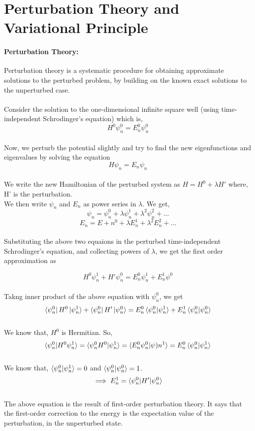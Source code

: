 \documentclass[12pt]{article}
\begin{document}
\section{Perturbation Theory and Variational Principle}

\paragraph{Perturbation Theory:}

Perturbation theory is a systematic procedure for obtaining approximate solutions to the perturbed problem, by building 
on the known exact solutions to the unperturbed case.
\\
\\
Consider the solution to the one-dimensional infinite square well (using time-independent Schrodinger's equation) which is, 
\[ H^0 \psi_n^0 = E_n^0 \psi_n^0\]
\\
Now, we perturb the potential slightly and try to find the new eigenfunctions and eigenvalues by solving the equation 
\[ H \psi_n = E_n \psi_n\]
\\
We write the new Hamiltonian of the perturbed system as $ H = H^0 + \lambda H'$ where, H' is the perturbation.
\\
We then write $\psi_n$ and $E_n$ as power series in $\lambda$. We get,
\[ \psi_n = \psi_n^0 + \lambda\psi_n^1 + \lambda^2 \psi_n^2 + ...\]
\[ E_n = E+n^0 + \lambda E_n^1 + \lambda^2 E_n^2 + ...\]
\\
Substituting the above two equaions in the perturbed time-independent Schrodinger's equation, and collecting powers of 
 $\lambda$, we get the first order approximation as

\[ H^0 \psi_n^1 + H' \psi_n^0 = E_n^0 \psi_n^1 + E_n^1 \psi^0\]
\\
Takng inner product of the above equation with $\psi_n^0$, we get
\[ \bra{\psi_n^0} H^0 \ket{\psi_n^1} + \bra{\psi_n^0} H' \ket{\psi_n^0} = E_n^0 \braket{\psi_n^0|\psi_n^1} +
 E_n^1 \braket{\psi_n^0|\psi_n^0}\]
\\
We know that, $H^0$ is Hermitian. So,
\[ \braket{\psi_n^0|H^0 \psi_n^1} = \braket{\psi_n^0 H^0| \psi_n^1} = \braket{E_n^0 \psi_n^0|\psi)n^1} = 
E_n^0 \braket{\psi_n^0|\psi_n^1}\]
\\
We know that, $\braket{\psi_n^0|\psi_n^1} = 0$ and $\braket{\psi_n^0|\psi_n^0} = 1$.
\\

\begin{equation}
\implies E_n^1 = \braket{\psi_n^0|H'|\psi_n^0}
\end{equation}
\\
The above equation is the result of first-order perturbation theory. It says that the first-order correction to 
the energy is the expectation value of the perturbation, in the unperturbed state. 
\\
\end{document}
